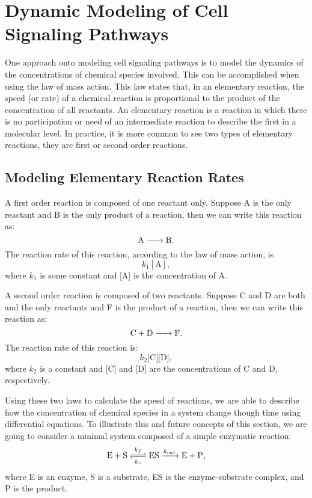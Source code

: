 \section{Dynamic Modeling of Cell Signaling Pathways}
One approach onto modeling cell signaling pathways is to model the 
dynamics of the concentrations of chemical species involved. This can be
accomplished when using the law of mass action. This law states that, 
in an elementary reaction, the speed (or rate) of a chemical reaction is 
proportional to the product of the concentration of all reactants. An 
elementary reaction is a reaction in which there is no participation or 
need of an intermediate reaction to describe the first in a molecular 
level. In practice, it is more common to see two types of elementary 
reactions, they are first or second order reactions. 

\subsection{Modeling Elementary Reaction Rates}
A first order reaction is composed of one reactant only. Suppose A is 
the only reactant and B is the only product of a reaction, then we can
write this reaction as:
\begin{equation*}
\ce{
    A -> B
}.
\end{equation*}
The reaction rate of this reaction, according to the law of mass 
action, is 
\begin{equation*}
    k_1[\text{A}],
\end{equation*}
where $k_1$ is some constant and [A] is the concentration of A. 

A second order reaction is composed of two reactants. Suppose C and D 
are both and the only reactants and F is the product of a reaction, then
we can write this reaction as:
\begin{equation*}
\ce{
    C + D -> F
}.
\end{equation*}
The reaction rate of this reaction is:
\begin{equation*}
    k_2\text{[C][D]},
\end{equation*}
where $k_2$ is a constant and [C] and [D] are the concentrations of C 
and D, respectively.

Using these two laws to calculate the speed of reactions, we are able 
to describe how the concentration of chemical species in a system change 
though time using differential equations. To illustrate this and future 
concepts of this section, we are going to consider a minimal system 
composed of a simple enzymatic reaction:
\begin{equation}
\ce{
    E + S <=>[\ce{$k$_f}][\ce{$k$_r}] ES ->[\ce{$k_{cat}$}] E + P
},
\label{eq:simple_enzymatic}
\end{equation}
where E is an enzyme, S is a substrate, ES is the enzyme-substrate
complex, and P is the product.

